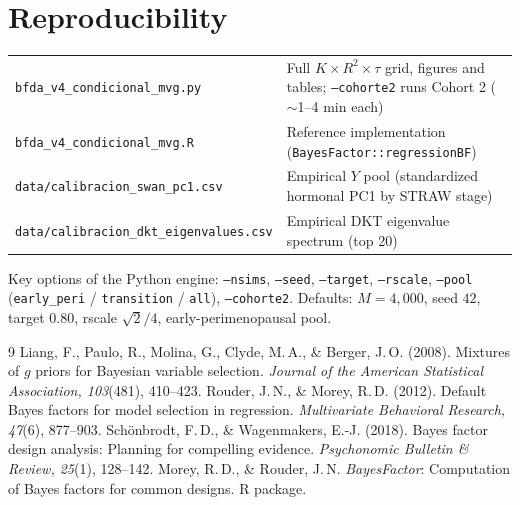 \documentclass[11pt,a4paper]{article}
\begin{document}
\section{Reproducibility}

\begin{table}[H]
\centering\small
\begin{tabular}{lp{10.2cm}}
\toprule
\texttt{bfda\_v4\_condicional\_mvg.py} & Full $K\times R^{2}\times\tau$ grid, figures and tables; \texttt{--cohorte2} runs Cohort 2 ($\sim$1--4 min each)\\
\texttt{bfda\_v4\_condicional\_mvg.R} & Reference implementation (\texttt{BayesFactor::regressionBF})\\
\texttt{data/calibracion\_swan\_pc1.csv} & Empirical $Y$ pool (standardized hormonal PC1 by STRAW stage)\\
\texttt{data/calibracion\_dkt\_eigenvalues.csv} & Empirical DKT eigenvalue spectrum (top 20)\\
\bottomrule
\end{tabular}
\end{table}

Key options of the Python engine: \texttt{--nsims}, \texttt{--seed}, \texttt{--target}, \texttt{--rscale}, \texttt{--pool} (\texttt{early\_peri} / \texttt{transition} / \texttt{all}), \texttt{--cohorte2}. Defaults: $M=4{,}000$, seed $42$, target $0.80$, rscale $\sqrt{2}/4$, early-perimenopausal pool.

\begin{thebibliography}{9}\small
{} Liang, F., Paulo, R., Molina, G., Clyde, M.\,A., \& Berger, J.\,O. (2008). Mixtures of $g$ priors for Bayesian variable selection. \emph{Journal of the American Statistical Association, 103}(481), 410--423.
 Rouder, J.\,N., \& Morey, R.\,D. (2012). Default Bayes factors for model selection in regression. \emph{Multivariate Behavioral Research, 47}(6), 877--903.
 Sch\"onbrodt, F.\,D., \& Wagenmakers, E.-J. (2018). Bayes factor design analysis: Planning for compelling evidence. \emph{Psychonomic Bulletin \& Review, 25}(1), 128--142.
 Morey, R.\,D., \& Rouder, J.\,N. \emph{BayesFactor}: Computation of Bayes factors for common designs. R package.
\end{thebibliography}
\end{document}
